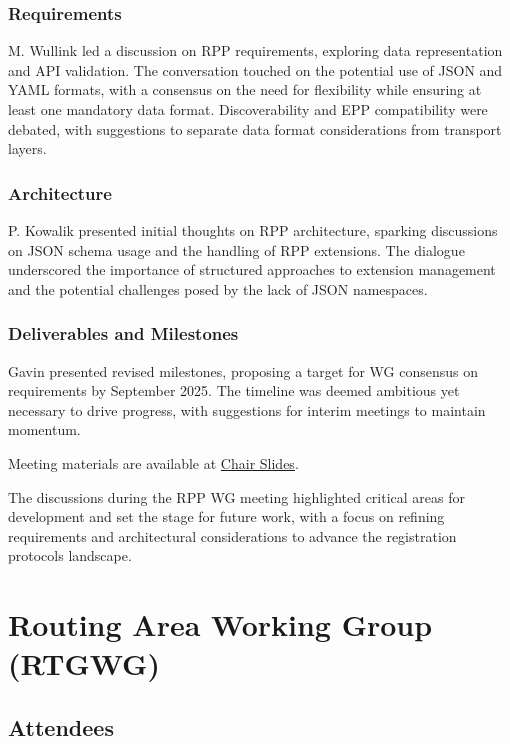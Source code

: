 \documentclass{article}
\begin{document}
\subsubsection{Requirements}
M. Wullink led a discussion on RPP requirements, exploring data representation and API validation. The conversation touched on the potential use of JSON and YAML formats, with a consensus on the need for flexibility while ensuring at least one mandatory data format. Discoverability and EPP compatibility were debated, with suggestions to separate data format considerations from transport layers.

\subsubsection{Architecture}
P. Kowalik presented initial thoughts on RPP architecture, sparking discussions on JSON schema usage and the handling of RPP extensions. The dialogue underscored the importance of structured approaches to extension management and the potential challenges posed by the lack of JSON namespaces.

\subsubsection{Deliverables and Milestones}
Gavin presented revised milestones, proposing a target for WG consensus on requirements by September 2025. The timeline was deemed ambitious yet necessary to drive progress, with suggestions for interim meetings to maintain momentum.

Meeting materials are available at \href{https://datatracker.ietf.org/meeting/122/materials/slides-122-rpp-1-chair-slides-02}{Chair Slides}.

The discussions during the RPP WG meeting highlighted critical areas for development and set the stage for future work, with a focus on refining requirements and architectural considerations to advance the registration protocols landscape.



\newpage

\section{Routing Area Working Group (RTGWG)}

\subsection{Attendees}
\end{document}
